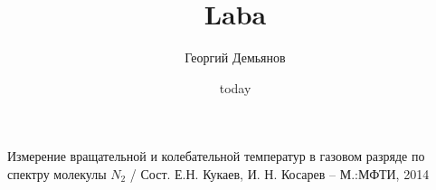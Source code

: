 \documentclass[a4paper,12pt]{article}
\title{Laba}
\author{Георгий Демьянов}
\date{today}
\begin{document}

\tableofcontents
\clearpage





\begin{thebibliography}{1}
Измерение вращательной и колебательной температур в газовом разряде по спектру молекулы $N_2$ / Сост. Е.Н. Кукаев, И. Н. Косарев -- М.:МФТИ, 2014
\end{thebibliography}


%
%
\end{document}
